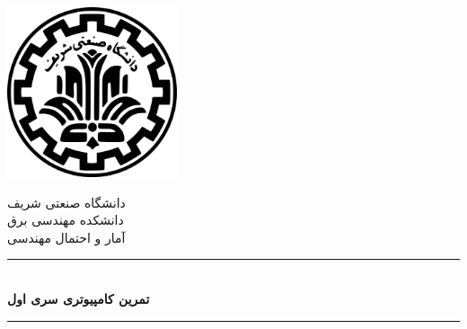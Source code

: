 \begin{titlepage}

    \newcommand{\HRule}{\rule{\linewidth}{0.5mm}} %
    
    \center
    \includegraphics[width=5cm]{Title/sut-logo.png}\\[1cm] %
     
    
    \center %
    
    
    \textsc{\LARGE دانشگاه صنعتی شریف }\\[1.5cm] %
    \textsc{\Large دانشکده مهندسی برق}\\[0.5cm] %
    \textsc{\large آمار و احتمال مهندسی}\\[0.5cm] %
    
    \makeatletter
    \HRule \\[0.4cm]
    { \huge \bfseries تمرین کامپیوتری سری اول}\\[0.4cm] %
    \HRule \\[1.5cm]
     

\end{titlepage}
